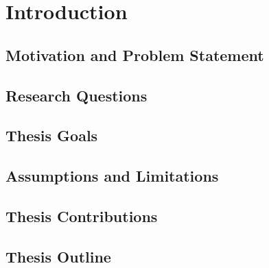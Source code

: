 \documentclass[../main.tex]{subfiles}
\begin{document}
\section{Introduction}\label{sec:introduction}
\subsection{Motivation and Problem Statement}
\subsection{Research Questions}
\subsection{Thesis Goals}
\subsection{Assumptions and Limitations}
\subsection{Thesis Contributions}
\subsection{Thesis Outline}
\end{document}
